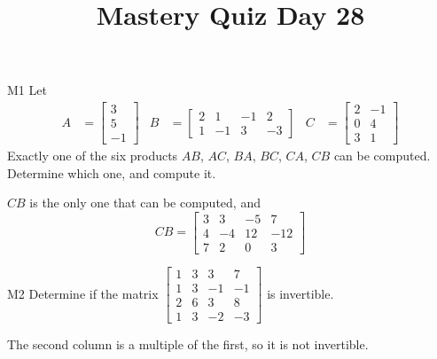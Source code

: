 \documentclass{sbgLAquiz}
\title{Mastery Quiz Day 28 }
\begin{document}
\begin{problem}{M1}
Let 
\begin{align*}
A &= \begin{bmatrix} 3 \\ 5 \\ -1  \end{bmatrix} & B&=\begin{bmatrix}  2 & 1 & -1 & 2 \\ 1 & -1 & 3 & -3  \end{bmatrix} & C &= \begin{bmatrix} 2 & -1 \\ 0 & 4 \\ 3 & 1 \end{bmatrix} \end{align*}
Exactly one of the six products $AB$, $AC$, $BA$, $BC$, $CA$, $CB$ can be computed.  Determine which one, and compute it.
\end{problem}
\begin{solution}
$CB$ is the only one that can be computed, and
$$CB=\begin{bmatrix} 3 & 3 & -5 & 7 \\ 4 & -4 & 12 & -12 \\ 7 & 2 & 0 & 3 \end{bmatrix}$$
\end{solution}
\begin{problem}{M2}
Determine if the matrix $\begin{bmatrix} 1 & 3 & 3 & 7 \\ 1 & 3 & -1 & -1 \\ 2 & 6 & 3 & 8 \\ 1 & 3 & -2 & -3 \end{bmatrix}$ is invertible.
\end{problem}
\begin{solution}
The second column is a multiple of the first, so it is not invertible.
\end{solution}
\end{document}

